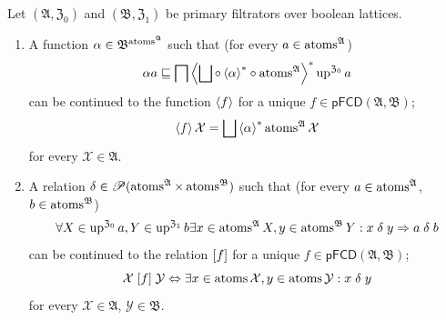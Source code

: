 \begin{thm}
\label{pf-atom-cont}Let $(\mathfrak{A},\mathfrak{Z}_{0})$ and $(\mathfrak{B},\mathfrak{Z}_{1})$
be primary filtrators over boolean lattices.
\begin{enumerate}
\item \label{pf-at-f}A function $\alpha\in\mathfrak{B}^{\operatorname{atoms}^{\mathfrak{A}}}$
such that (for every $a\in\operatorname{atoms}^{\mathfrak{A}}$)
\begin{equation}
\alpha a\sqsubseteq\bigsqcap\rsupfun{\bigsqcup\circ\rsupfun{\alpha}\circ\atoms^{\mathfrak{A}}}\up^{\mathfrak{Z}_{0}}a\label{pf-alpha-a-greater}
\end{equation}
can be continued to the function $\left\langle f\right\rangle$ for a unique $f\in\mathsf{pFCD}(\mathfrak{A},\mathfrak{B})$;
\begin{equation}
\supfun f\mathcal{X}=\bigsqcup\rsupfun{\alpha}\atoms^{\mathfrak{A}}\mathcal{X}\label{pf-atoms-fun-cont}
\end{equation}
for every $\mathcal{X}\in\mathfrak{A}$.
\item \label{pf-at-r}A relation $\delta\in\mathscr{P}(\operatorname{atoms}^{\mathfrak{A}}\times\operatorname{atoms}^{\mathfrak{B}})$
such that (for every $a\in\operatorname{atoms}^{\mathfrak{A}}$, $b\in\operatorname{atoms}^{\mathfrak{B}}$)
\begin{equation}
\forall X\in\operatorname{up}^{\mathfrak{Z}_{0}}a,Y\in\operatorname{up}^{\mathfrak{Z}_{1}}b\exists x\in\operatorname{atoms}^{\mathfrak{A}}X,y\in\operatorname{atoms}^{\mathfrak{B}}Y:x\mathrel{\delta}y\Rightarrow a\mathrel{\delta}b\label{pf-atoms-delta}
\end{equation}
can be continued to the relation $\mathrel{\left[f\right]}$ for a unique $f\in\mathsf{pFCD}(\mathfrak{A},\mathfrak{B})$;
\begin{equation}
\mathcal{X}\mathrel{\left[f\right]}\mathcal{Y}\Leftrightarrow\exists x\in\operatorname{atoms}\mathcal{X},y\in\operatorname{atoms}\mathcal{Y}:x\mathrel{\delta}y\label{pf-atoms-rel-cont}
\end{equation}
for every $\mathcal{X}\in\mathfrak{A}$, $\mathcal{Y}\in\mathfrak{B}$.
\end{enumerate}
\end{thm}
